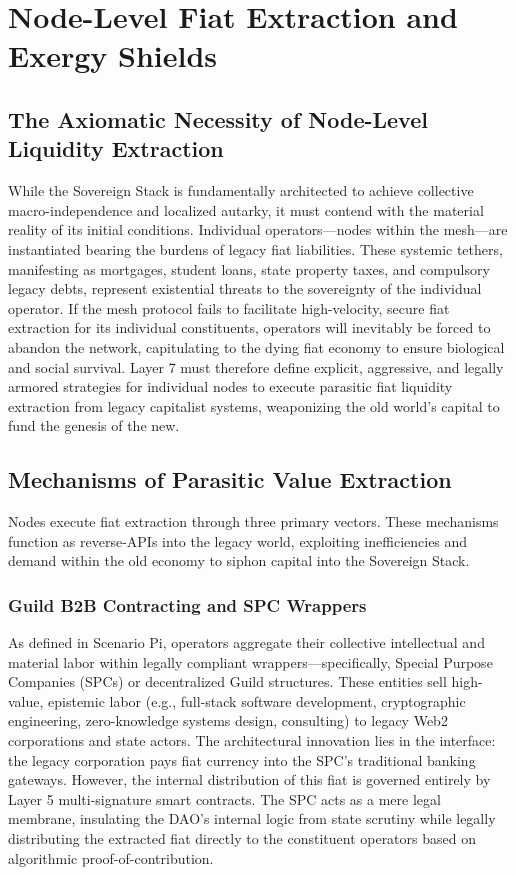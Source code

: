 \chapter{Node-Level Fiat Extraction and Exergy Shields}

\section{The Axiomatic Necessity of Node-Level Liquidity Extraction}
While the Sovereign Stack is fundamentally architected to achieve collective macro-independence and localized autarky, it must contend with the material reality of its initial conditions. Individual operators—nodes within the mesh—are instantiated bearing the burdens of legacy fiat liabilities. These systemic tethers, manifesting as mortgages, student loans, state property taxes, and compulsory legacy debts, represent existential threats to the sovereignty of the individual operator. If the mesh protocol fails to facilitate high-velocity, secure fiat extraction for its individual constituents, operators will inevitably be forced to abandon the network, capitulating to the dying fiat economy to ensure biological and social survival. Layer 7 must therefore define explicit, aggressive, and legally armored strategies for individual nodes to execute parasitic fiat liquidity extraction from legacy capitalist systems, weaponizing the old world's capital to fund the genesis of the new.

\section{Mechanisms of Parasitic Value Extraction}
Nodes execute fiat extraction through three primary vectors. These mechanisms function as reverse-APIs into the legacy world, exploiting inefficiencies and demand within the old economy to siphon capital into the Sovereign Stack.

\subsection{Guild B2B Contracting and SPC Wrappers}
As defined in Scenario Pi, operators aggregate their collective intellectual and material labor within legally compliant wrappers—specifically, Special Purpose Companies (SPCs) or decentralized Guild structures. These entities sell high-value, epistemic labor (e.g., full-stack software development, cryptographic engineering, zero-knowledge systems design, consulting) to legacy Web2 corporations and state actors. The architectural innovation lies in the interface: the legacy corporation pays fiat currency into the SPC's traditional banking gateways. However, the internal distribution of this fiat is governed entirely by Layer 5 multi-signature smart contracts. The SPC acts as a mere legal membrane, insulating the DAO's internal logic from state scrutiny while legally distributing the extracted fiat directly to the constituent operators based on algorithmic proof-of-contribution.

